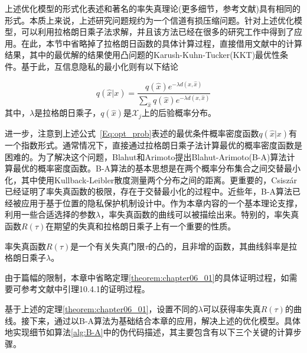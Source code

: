 上述优化模型的形式化表述和著名的率失真理论(更多细节，参考文献)具有相同的形式\cite{wang2016on}。本质上来说，上述研究问题规约为一个信道有损压缩问题。针对上述优化模型，可以利用拉格朗日乘子法求解，并且该方法已经在很多的研究工作中得到了应用。在此，本节中省略掉了拉格朗日函数的具体计算过程，直接借用文献中的计算结果，其中的最优解的结果使用凸问题的Karush-Kuhn-Tucker(KKT)最优性条件\cite{boyd2004convex}。基于此，互信息隐私的最小化则有以下结论

 \begin{equation}\label{Eq:opt_prob}
 q(\hat{x}|x)=\frac{q(\hat{x})e^{-\lambda d(x,\hat{x})}}{\sum_{\hat{x}}q(\hat{x})e^{-\lambda d(x,\hat{x})}}
 \end{equation}
其中，$\lambda$是拉格朗日乘子，$q(\hat{x})$是$\hat{\mathcal{X}}_j$上的后验概率分布。

进一步，注意到上述公式~\ref{Eq:opt_prob}表述的最优条件概率密度函数$q(\hat{x}|x)$有一个指数形式。通常情况下，直接通过拉格朗日乘子法计算最优的概率密度函数是困难的。为了解决这个问题，Blahut\cite{blahut1972computation}和Arimoto\cite{arimoto1972an}提出Blahut-Arimoto(B-A)算法计算最优的概率密度函数。B-A算法的基本思想是在两个概率分布集合之间交替最小化，其中使用Kullback-Leibler散度测量两个分布之间的距离。更重要的，Csisz\'{a}r\cite{csiszar1974on,csiszar1984information}已经证明了率失真函数的极限，存在于交替最小化的过程中。近些年，B-A算法已经被应用于基于位置的隐私保护机制设计中\cite{oya2017back,zhang2019online}。作为本章内容的一个基本理论支撑，利用一些合适选择的参数$\lambda$，率失真函数的曲线可以被描绘出来。特别的，率失真函数$R(\tau)$在期望的失真和拉格朗日乘子上有一个重要的性质。

\begin{theorem}\label{theorem:chapter06_01}
	率失真函数$R(\tau)$是一个有关失真门限$\tau$的凸的，且非增的函数，其曲线斜率是拉格朗日乘子$\lambda$。
\end{theorem}

由于篇幅的限制，本章中省略定理\ref{theorem:chapter06_01}的具体证明过程，如需要可参考文献中引理10.4.1的证明过程。

基于上述的定理\ref{theorem:chapter06_01}，设置不同的$\lambda$可以获得率失真$R(\tau)$的曲线。接下来，通过以B-A算法为基础结合本章的应用，解决上述的优化模型。具体地实现细节如算法\ref{alg:B-A}中的伪代码描述，其主要包含有以下三个关键的计算步骤。


